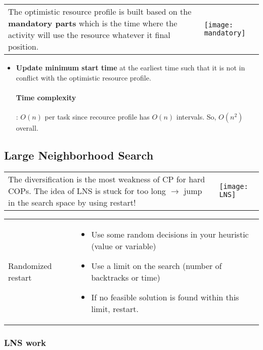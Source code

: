 \begin{tabular}{m{11cm}m{6cm}}
The optimistic resource profile is built based on the
\textbf{mandatory parts} which is the time where the activity will
use the resource whatever it final position.
&
\texttt{[image: mandatory]}
\end{tabular}

\begin{itemize}
    \item \textbf{Update minimum start time} at the earliest
        time such that it is not in conflict with the optimistic
        resource profile.

        \paragraph{Time complexity}: $O(n)$ per task since recource
        profile has $O(n)$ intervals. So, $O(n^2)$ overall.
\end{itemize}


\subsection{Large Neighborhood Search}

\begin{tabular}{m{12cm}m{3cm}}
    The diversification is the most weakness of CP for hard COPs.
    The idea of LNS is stuck for too long $\to$ jump in the search space
    by using restart!
    &
    \texttt{[image: LNS]}
\end{tabular}

\begin{tabular}{m{2cm}m{11cm}}
    Randomized restart & 
    \begin{itemize}
        \item Use some random decisions in your heuristic (value or variable)
        \item Use a limit on the search (number of backtracks or
            time)
        \item If no feasible solution is found within this limit,
            restart.
    \end{itemize}
\end{tabular}

\subsubsection{LNS work}


